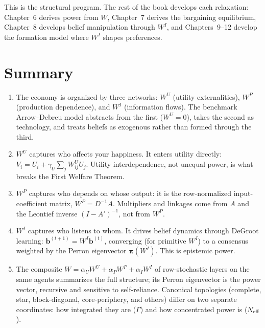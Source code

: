 \documentclass[../structural_economics_book.tex]{subfiles}
\begin{document}
This is the structural program. The rest of the book develops each relaxation: Chapter~6 derives power from $W$, Chapter~7 derives the bargaining equilibrium, Chapter~8 develops belief manipulation through $W^I$, and Chapters~9--12 develop the formation model where $W^I$ shapes preferences.


\section{Summary}
\label{ch05:sec:summary}

\begin{enumerate}
\item The economy is organized by three networks: $W^U$ (utility externalities), $W^P$ (production dependence), and $W^I$ (information flows). The benchmark Arrow--Debreu model abstracts from the first ($W^U = 0$), takes the second as technology, and treats beliefs as exogenous rather than formed through the third.

\item $W^U$ captures who affects your happiness. It enters utility directly: $V_i = U_i + \gamma_U \sum_j W^U_{ij} U_j$. Utility interdependence, not unequal power, is what breaks the First Welfare Theorem.

\item $W^P$ captures who depends on whose output: it is the row-normalized input-coefficient matrix, $W^P = D^{-1}A$. Multipliers and linkages come from $A$ and the Leontief inverse $(I - A')^{-1}$, not from $W^P$.

\item $W^I$ captures who listens to whom. It drives belief dynamics through DeGroot learning: $\mathbf{b}^{(t+1)} = W^I \mathbf{b}^{(t)}$, converging (for primitive $W^I$) to a consensus weighted by the Perron eigenvector $\boldsymbol{\pi}(W^I)$. This is epistemic power.

\item The composite $W = \alpha_U W^U + \alpha_P W^P + \alpha_I W^I$ of row-stochastic layers on the same agents summarizes the full structure; its Perron eigenvector is the power vector, recursive and sensitive to self-reliance. Canonical topologies (complete, star, block-diagonal, core-periphery, and others) differ on two separate coordinates: how integrated they are ($\Gamma$) and how concentrated power is ($N_{\text{eff}}$).
\end{enumerate}
\end{document}
